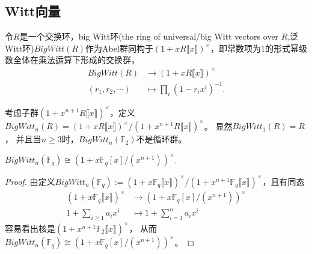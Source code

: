 \subsection{Witt向量}
令$R$是一个交换环，big Witt环(the ring of universal/big Witt vectors over $R$,泛Witt环)$BigWitt(R)$作为Abel群同构于$(1+xR\llbracket x\rrbracket )^{\times}$，即常数项为$1$的形式幂级数全体在乘法运算下形成的交换群，
\begin{align*}
BigWitt(R) &\longrightarrow (1+xR\llbracket x\rrbracket )^{\times}\\
(r_1,r_2,\cdots) & \mapsto \prod_i(1-r_i x^i)^{-1}.
\end{align*}



考虑子群$(1+x^{n+1}R\llbracket x\rrbracket )^{\times}$，定义$BigWitt_n(R)=(1+xR\llbracket x\rrbracket )^{\times}/(1+x^{n+1}R\llbracket x\rrbracket )^{\times}$。 显然$BigWitt_1(R)=R$， 并且当$n\geq 3$时，$BigWitt_n(\mathbb{F}_2)$不是循环群。

% 
% 							
% 									
%
{\color{blue}\begin{lemma}
	 $BigWitt_n(\mathbb{F}_q)\cong (1+x\mathbb{F}_q[x]/(x^{n+1}))^{\times}$.
\end{lemma}}
\begin{proof}
	由定义$BigWitt_n(\mathbb{F}_q):=(1+x \mathbb{F}_q\llbracket x\rrbracket )^{\times}/(1+x^{n+1} \mathbb{F}_q\llbracket x\rrbracket )^{\times}$，且有同态
\begin{align*}
(1+x \mathbb{F}_q\llbracket x\rrbracket )^{\times} &\longrightarrow (1+x \mathbb{F}_q[x]/(x^{n+1}))^{\times}\\
1+\sum_{i\geq 1}a_i x^i &\mapsto 1+\sum_{i = 1}^{n}a_i x^i
\end{align*}
容易看出核是$(1+x^{n+1} \mathbb{F}_2\llbracket x\rrbracket )^{\times}$，
从而$BigWitt_n(\mathbb{F}_q)\cong (1+x\mathbb{F}_q[x]/(x^{n+1}))^{\times}$。
\end{proof}


